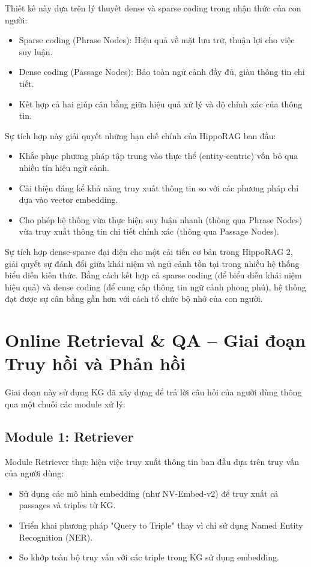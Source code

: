 \documentclass[../main.tex]{subfiles}
\begin{document}
Thiết kế này dựa trên lý thuyết dense và sparse coding trong nhận thức của con người:
\begin{itemize}
\item Sparse coding (Phrase Nodes): Hiệu quả về mặt lưu trữ, thuận lợi cho việc suy luận.
\item Dense coding (Passage Nodes): Bảo toàn ngữ cảnh đầy đủ, giàu thông tin chi tiết.
\item Kết hợp cả hai giúp cân bằng giữa hiệu quả xử lý và độ chính xác của thông tin.
\end{itemize}

Sự tích hợp này giải quyết những hạn chế chính của HippoRAG ban đầu:
\begin{itemize}
\item Khắc phục phương pháp tập trung vào thực thể (entity-centric) vốn bỏ qua nhiều tín hiệu ngữ cảnh.
\item Cải thiện đáng kể khả năng truy xuất thông tin so với các phương pháp chỉ dựa vào vector embedding.
\item Cho phép hệ thống vừa thực hiện suy luận nhanh (thông qua Phrase Nodes) vừa truy xuất thông tin chi tiết chính xác (thông qua Passage Nodes).
\end{itemize}

Sự tích hợp dense-sparse đại diện cho một cải tiến cơ bản trong HippoRAG 2, giải quyết sự đánh đổi giữa khái niệm và ngữ cảnh tồn tại trong nhiều hệ thống biểu diễn kiến thức. Bằng cách kết hợp cả sparse coding (để biểu diễn khái niệm hiệu quả) và dense coding (để cung cấp thông tin ngữ cảnh phong phú), hệ thống đạt được sự cân bằng gần hơn với cách tổ chức bộ nhớ của con người.

\section{Online Retrieval \& QA – Giai đoạn Truy hồi và Phản hồi}
Giai đoạn này sử dụng KG đã xây dựng để trả lời câu hỏi của người dùng thông qua một chuỗi các module xử lý:

\subsection{Module 1: Retriever}
Module Retriever thực hiện việc truy xuất thông tin ban đầu dựa trên truy vấn của người dùng:

\begin{itemize}
\item Sử dụng các mô hình embedding (như NV-Embed-v2) để truy xuất cả passages và triples từ KG.
\item Triển khai phương pháp "Query to Triple" thay vì chỉ sử dụng Named Entity Recognition (NER).
\item So khớp toàn bộ truy vấn với các triple trong KG sử dụng embedding.
\end{itemize}
\end{document}
